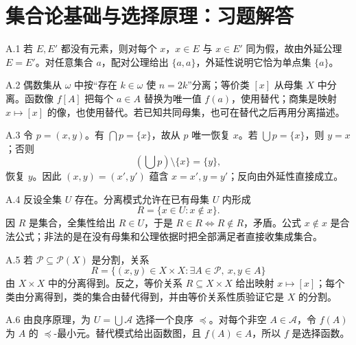 \chapter{集合论基础与选择原理：习题解答}

\begin{solution}{A.1}
若 \(E,E'\) 都没有元素，则对每个 \(x\)，\(x\in E\) 与 \(x\in E'\) 同为假，故由外延公理 \(E=E'\)。对任意集合 \(a\)，配对公理给出 \(\{a,a\}\)，外延性说明它恰为单点集 \(\{a\}\)。
\end{solution}

\begin{solution}{A.2}
偶数集从 \(\omega\) 中按“存在 \(k\in\omega\) 使 \(n=2k\)”分离；等价类 \([x]\) 从母集 \(X\) 中分离。函数像 \(f[A]\) 把每个 \(a\in A\) 替换为唯一值 \(f(a)\)，使用替代；商集是映射 \(x\mapsto[x]\) 的像，也使用替代。若已知共同母集，也可在替代之后再用分离描述。
\end{solution}

\begin{solution}{A.3}
令 \(p=(x,y)\)。有 \(\bigcap p=\{x\}\)，故从 \(p\) 唯一恢复 \(x\)。若 \(\bigcup p=\{x\}\)，则 \(y=x\)；否则
\[
 (\bigcup p)\setminus\{x\}=\{y\},
\]
恢复 \(y\)。因此 \((x,y)=(x',y')\) 蕴含 \(x=x',y=y'\)；反向由外延性直接成立。
\end{solution}

\begin{solution}{A.4}
反设全集 \(U\) 存在。分离模式允许在已有母集 \(U\) 内形成
\[
 R=\{x\in U:x\notin x\}.
\]
因 \(R\) 是集合，全集性给出 \(R\in U\)，于是 \(R\in R\Longleftrightarrow R\notin R\)，矛盾。公式 \(x\notin x\) 是合法公式；非法的是在没有母集和公理依据时把全部满足者直接收集成集合。
\end{solution}

\begin{solution}{A.5}
若 \(\mathcal P\subseteq\mathcal P(X)\) 是分割，关系
\[
 R=\{(x,y)\in X\times X:\exists A\in\mathcal P,\ x,y\in A\}
\]
由 \(X\times X\) 中的分离得到。反之，等价关系 \(R\subseteq X\times X\) 给出映射 \(x\mapsto[x]\)；每个类由分离得到，类的集合由替代得到，并由等价关系性质验证它是 \(X\) 的分割。
\end{solution}

\begin{solution}{A.6}
由良序原理，为 \(U=\bigcup\mathcal A\) 选择一个良序 \(\preceq\)。对每个非空 \(A\in\mathcal A\)，令 \(f(A)\) 为 \(A\) 的 \(\preceq\)-最小元。替代模式给出函数图，且 \(f(A)\in A\)，所以 \(f\) 是选择函数。
\end{solution}

